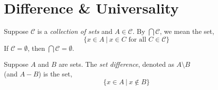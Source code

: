 \renewcommand{\theenumi}{\arabic{enumi}}
\renewcommand{\labelenumi}{\theenumi.}
\section{Difference \& Universality}
    
    \begin{definition}
        Suppose $\mathcal{C}$ is a \textit{collection of sets} and $A\in \mathcal{C}$. By $
        \bigcap \mathcal{C}$, we mean the set, $$\{x\in A \ | \ x\in C \text{ for all } C\in \mathcal{C}\}$$
        If $\mathcal{C} = \emptyset$, then $\bigcap \mathcal{C} = \emptyset$.
    \end{definition}   

    \begin{definition}
        Suppose $A$ and $B$ are sets. The \textit{set difference}, denoted as $A \setminus B$ \\ (and $A-B$) is the set, $$\{x\in A \ | \ x \notin B\}$$
    \end{definition}




    

